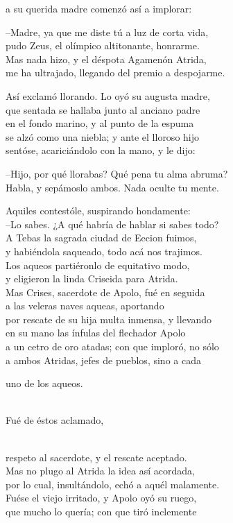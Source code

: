 \documentclass[11pt,twoside]{article}
\newcommand{\dlgo}[2]{\sbox{\dbox}{#1}\parbox[t]{\linewidth}{#1\strut\\[0pt]\hspace*{\wd\dbox}\hspace{\fontdimen2\font}#2\strut}}
\begin{document}
a su querida madre comenzó así a implorar:\par
--Madre, ya que me diste tú a luz de corta vida,\\
pudo Zeus, el olímpico altitonante, honrarme.\\
Mas nada hizo, y el déspota Agamenón Atrida,\\
me ha ultrajado, llegando del premio a despojarme.\par
Así exclamó llorando. Lo oyó su augusta madre,\\
que sentada se hallaba junto al anciano padre\\
en el fondo marino, y al punto de la espuma\\
se alzó como una niebla; y ante el lloroso hijo\\
sentóse, acariciándolo con la mano, y le dijo:\par
--Hijo, por qué llorabas? Qué pena tu alma abruma?\\
Habla, y sepámoslo ambos. Nada oculte tu mente.\par
Aquiles contestóle, suspirando hondamente:\\
--Lo sabes. ¿A qué habría de hablar si sabes todo?\\
A Tebas la sagrada ciudad de Eecion fuimos,\\
y habiéndola saqueado, todo acá nos trajimos.\\
Los aqueos partiéronlo de equitativo modo,\\
y eligieron la linda Criseida para Atrida.\\
Mas Crises, sacerdote de Apolo, fué en seguida\\
a las veleras naves aqueas, aportando\\
por rescate de su hija multa inmensa, y llevando\\
en su mano las ínfulas del flechador Apolo\\
a un cetro de oro atadas; con que imploró, no sólo\\
a ambos Atridas, jefes de pueblos, sino a cada\\
\dlgo{uno de los aqueos.}{Fué de éstos aclamado,}\\
respeto al sacerdote, y el rescate aceptado.\\
Mas no plugo al Atrida la idea así acordada,\\
por lo cual, insultándolo, echó a aquél malamente.\\
Fuése el viejo irritado, y Apolo oyó su ruego,\\
que mucho lo quería; con que tiró inclemente\\
\end{document}
